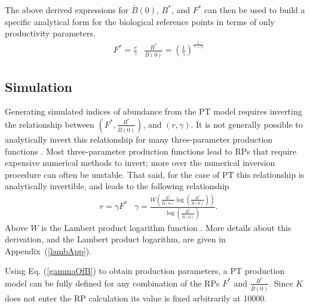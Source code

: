 %
The above derived expressions for $\bar B(0)$, $B^*$, and $F^*$ can then be used to
build a specific analytical form for the biological reference points in terms of only
productivity parameters.
\begin{align}\label{ptRP}
&F^* = \frac{r}{\gamma}
&\frac{B^*}{\bar B(0)} = \left(\frac{1}{\gamma}\right)^{\frac{1}{\gamma-1}}
\end{align}

%
\subsection{Simulation}

Generating simulated indices of abundance from the PT model requires
inverting the relationship between $\left(F^*, \frac{B^*}{\bar B(0)}\right)$, and
$(r, \gamma)$. It is not generally possible to analytically invert this
relationship for many three-parameter production functions \cite{punt_extending_2019, schnute_analytical_1998}. %
Most three-parameter production functions lead to RPs that require expensive
numerical methods to invert; more over the numerical inversion procedure can %
often be unstable. That said, for the case of PT this relationship is
analytically invertible, and leads to the following relationship
%
\begin{align}
&r = \gamma F^*
&\gamma = \frac{W\left(\frac{B^*}{\bar B(0)}\log\left(\frac{B^*}{\bar B(0)}\right)\right)}{\log\left(\frac{B^*}{\bar B(0)}\right)}. \label{gammaOfB}
\end{align}
%
Above $W$ is the Lambert product logarithm function \cite{lehtonen_lambert_2016, corless_lambertw_1996}. More details about this
derivation, and the Lambert product logarithm, are given in \mbox{Appendix (\ref{lambApp}).}

%
Using Eq. (\ref{gammaOfB}) to obtain production parameters, a PT production model
can be fully defined for any combination of the RPs $F^*$ and $\frac{B^*}{\bar B(0)}$.
Since $K$ does not enter the RP calculation its value is fixed arbitrarily at 10000.

